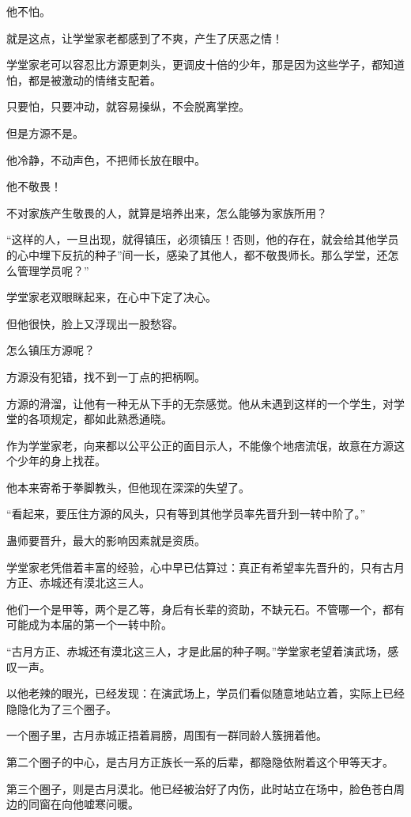 \begin{this_body}
他不怕。

就是这点，让学堂家老都感到了不爽，产生了厌恶之情！

学堂家老可以容忍比方源更刺头，更调皮十倍的少年，那是因为这些学子，都知道怕，都是被激动的情绪支配着。

只要怕，只要冲动，就容易操纵，不会脱离掌控。

但是方源不是。

他冷静，不动声色，不把师长放在眼中。

他不敬畏！

不对家族产生敬畏的人，就算是培养出来，怎么能够为家族所用？

“这样的人，一旦出现，就得镇压，必须镇压！否则，他的存在，就会给其他学员的心中埋下反抗的种子”间一长，感染了其他人，都不敬畏师长。那么学堂，还怎么管理学员呢？”

学堂家老双眼眯起来，在心中下定了决心。

但他很快，脸上又浮现出一股愁容。

怎么镇压方源呢？

方源没有犯错，找不到一丁点的把柄啊。

方源的滑溜，让他有一种无从下手的无奈感觉。他从未遇到这样的一个学生，对学堂的各项规定，都如此熟悉通晓。

作为学堂家老，向来都以公平公正的面目示人，不能像个地痞流氓，故意在方源这个少年的身上找茬。

他本来寄希于拳脚教头，但他现在深深的失望了。

“看起来，要压住方源的风头，只有等到其他学员率先晋升到一转中阶了。”

蛊师要晋升，最大的影响因素就是资质。

学堂家老凭借着丰富的经验，心中早已估算过：真正有希望率先晋升的，只有古月方正、赤城还有漠北这三人。

他们一个是甲等，两个是乙等，身后有长辈的资助，不缺元石。不管哪一个，都有可能成为本届的第一个一转中阶。

“古月方正、赤城还有漠北这三人，才是此届的种子啊。”学堂家老望着演武场，感叹一声。

以他老辣的眼光，已经发现：在演武场上，学员们看似随意地站立着，实际上已经隐隐化为了三个圈子。

一个圈子里，古月赤城正捂着肩膀，周围有一群同龄人簇拥着他。

第二个圈子的中心，是古月方正族长一系的后辈，都隐隐依附着这个甲等天才。

第三个圈子，则是古月漠北。他已经被治好了内伤，此时站立在场中，脸色苍白周边的同窗在向他嘘寒问暖。


\end{this_body}
